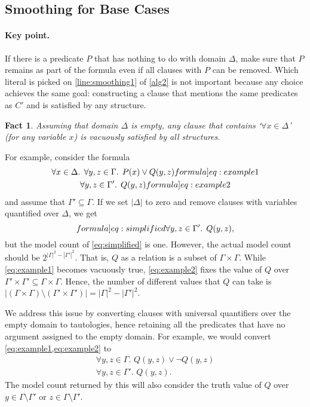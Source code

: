 \documentclass{article}
\newtheorem{fact}{Fact}
\theoremstyle{definition}
\begin{document}

\subsection{Smoothing for Base Cases}\label{sec:smoothingbase}

\paragraph{Key point.}
If there is a predicate $P$ that has nothing to do with domain $\Delta$, make
sure that $P$ remains as part of the formula even if all clauses with $P$ can be
removed. Which literal is picked on \cref{line:smoothing1} of \cref{alg2} is not
important because any choice achieves the same goal: constructing a clause that
mentions the same predicates as $C'$ and is satisfied by any structure.

\begin{fact}
  Assuming that domain $\Delta$ is empty, any clause that contains
  `$\forall x \in \Delta$' (for any variable $x$) is vacuously satisfied by all
  structures.
\end{fact}

For example, consider the formula
\begin{gather}
  \forall x \in \Delta\text{. }\forall y, z \in \Gamma\text{. }P(x) \lor Q(y, z)\label[formula]{eq:example1}\\
  \forall y, z \in \Gamma'\text{. }Q(y, z)\label[formula]{eq:example2}
\end{gather}
and assume that $\Gamma' \subseteq \Gamma$. If we set $|\Delta|$
to zero and remove clauses with variables quantified over $\Delta$, we get
\begin{equation}\label[formula]{eq:simplified}
  \forall y, z \in \Gamma'\text{. }Q(y, z),
\end{equation}
but the model count of \cref{eq:simplified} is one. However, the actual model
count should be $2^{|\Gamma|^2 - |\Gamma'|^2}$. That is, $Q$ as a relation is a
subset of $\Gamma \times \Gamma$. While \cref{eq:example1} becomes vacuously
true, \cref{eq:example2} fixes the value of $Q$ over
$\Gamma' \times \Gamma' \subseteq \Gamma \times \Gamma$. Hence, the number of
different values that $Q$ can take is
$|(\Gamma \times \Gamma) \setminus (\Gamma' \times \Gamma')| = |\Gamma|^{2} - |\Gamma'|^{2}$.

We address this issue by converting clauses with universal quantifiers over the
empty domain to tautologies, hence retaining all the predicates that have no
argument assigned to the empty domain. For example, we would convert
\cref{eq:example1,eq:example2} to
\begin{gather*}
  \forall y, z \in \Gamma\text{. }Q(y, z) \lor \neg Q(y, z)\\
  \forall y, z \in \Gamma'\text{. }Q(y, z).
\end{gather*}
The model count returned by this will also consider the truth value of $Q$ over
$y \in \Gamma \setminus \Gamma'$ or $z \in \Gamma \setminus \Gamma'$.
\end{document}
